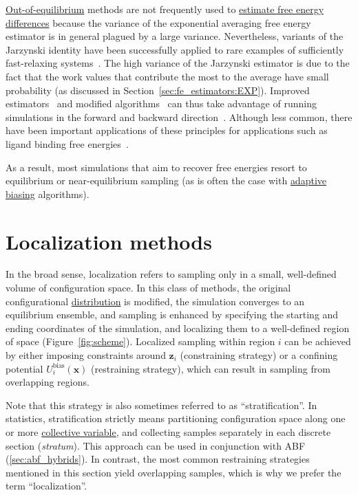 \documentclass[9pt,review]{livecoms}
\newcommand{\vx}{\mathbf{x}}
\newcommand{\vz}{\mathbf{z}}
\begin{document}
\hyperlink{ref:OutOfEq} {Out-of-equilibrium} methods are not frequently used to \hyperlink{ref:FEestimator} {estimate free energy differences} because the variance of the exponential averaging free energy estimator is in general plagued by a large variance.
Nevertheless, variants of the Jarzynski identity have been successfully applied to rare examples of sufficiently fast-relaxing systems~\cite{park-khalili-araghi-tajkhorshid-schulten-03}.
The high variance of the Jarzynski estimator is due to the fact that the work values that contribute the most to the average have small probability (as discussed in Section~\ref{sec:fe_estimators:EXP}).
Improved estimators~\cite{minh-adlib-08} and modified algorithms~\cite{VJ08,hartmann-schuette-zhang-19,rousset2006equilibrium} can thus take advantage of running simulations in the forward and backward direction~\cite{hummer-07}. Although less common, there have been important applications of these principles for applications such as ligand binding free energies~\citep{alchemy_Gapsys_2020}.


As a result, most simulations that aim to recover free energies resort to equilibrium or near-equilibrium sampling (as is often the case with \hyperlink{ref:Adaptive} {adaptive} \hyperlink{ref:biasingE} {biasing} algorithms).


\section{Localization methods}
\label{sec:localization}

In the broad sense, localization refers to sampling only in a small, well-defined volume of configuration space. In this class of methods, the original configurational \hyperlink{ref:Distribution}{distribution} is modified, the simulation converges to an equilibrium ensemble, and sampling is enhanced by specifying the starting and ending coordinates of the simulation, and localizing them to a well-defined region of space (Figure~\ref{fig:scheme}). Localized sampling within region $i$ can be achieved by either imposing constraints around $\vz_i$ (constraining strategy) or a confining potential $U^{\mathrm{bias}}_i(\vx)$ (restraining strategy), which can result in sampling from overlapping regions.

Note that this strategy is also sometimes referred to as ``stratification''. In statistics, stratification strictly means partitioning configuration space along one or more \hyperlink{ref:CV} {collective variable}, and collecting samples separately in each discrete section (\textit{stratum}). This approach can be used in conjunction with ABF (\ref{sec:abf_hybrids}).
In contrast, the most common restraining strategies mentioned in this section yield overlapping samples, which is why we prefer the term ``localization''.
\end{document}
